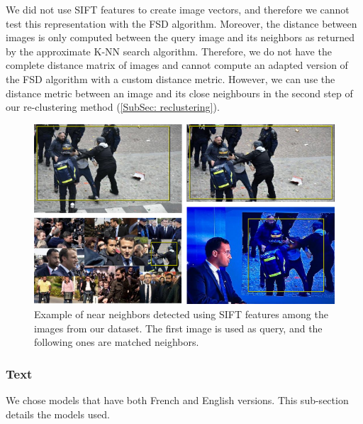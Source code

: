 \begin{enumerate}
    We did not use SIFT features to create image vectors, and therefore we cannot test this representation with the FSD algorithm. Moreover, the distance between images is only computed between the query image and its neighbors as returned by the approximate K-NN search algorithm. Therefore, we do not have the complete distance matrix of images and cannot compute an adapted version of the FSD algorithm with a custom distance metric. However, we can use the distance metric between an image and its close neighbours in the second step of our re-clustering method (\ref{SubSec: reclustering}).
    
\begin{figure}[ht]
  \centering
  \includegraphics[width=\linewidth]{./figures/Benalla.png}
  \caption[Example of near neighbors detected using SIFT features among the images from our dataset]{Example of near neighbors detected using SIFT features among the images from our dataset. The first image is used as query, and the following ones are matched neighbors.}
  \label{Fig:Benalla}
\end{figure}

\end{enumerate}

\subsubsection{Text}
\label{Subsubsec: text}
We chose models that have both French and English versions. This sub-section details the models used.

